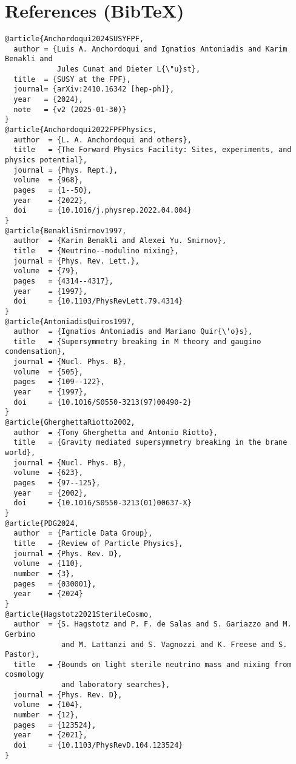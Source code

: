 \documentclass[11pt]{article}
\begin{document}
  \section*{References (Bib\TeX)}
      \begin{verbatim}
@article{Anchordoqui2024SUSYFPF,
  author = {Luis A. Anchordoqui and Ignatios Antoniadis and Karim Benakli and
            Jules Cunat and Dieter L{\"u}st},
  title  = {SUSY at the FPF},
  journal= {arXiv:2410.16342 [hep-ph]},
  year   = {2024},
  note   = {v2 (2025-01-30)}
}
@article{Anchordoqui2022FPFPhysics,
  author  = {L. A. Anchordoqui and others},
  title   = {The Forward Physics Facility: Sites, experiments, and physics potential},
  journal = {Phys. Rept.},
  volume  = {968},
  pages   = {1--50},
  year    = {2022},
  doi     = {10.1016/j.physrep.2022.04.004}
}
@article{BenakliSmirnov1997,
  author  = {Karim Benakli and Alexei Yu. Smirnov},
  title   = {Neutrino--modulino mixing},
  journal = {Phys. Rev. Lett.},
  volume  = {79},
  pages   = {4314--4317},
  year    = {1997},
  doi     = {10.1103/PhysRevLett.79.4314}
}
@article{AntoniadisQuiros1997,
  author  = {Ignatios Antoniadis and Mariano Quir{\'o}s},
  title   = {Supersymmetry breaking in M theory and gaugino condensation},
  journal = {Nucl. Phys. B},
  volume  = {505},
  pages   = {109--122},
  year    = {1997},
  doi     = {10.1016/S0550-3213(97)00490-2}
}
@article{GherghettaRiotto2002,
  author  = {Tony Gherghetta and Antonio Riotto},
  title   = {Gravity mediated supersymmetry breaking in the brane world},
  journal = {Nucl. Phys. B},
  volume  = {623},
  pages   = {97--125},
  year    = {2002},
  doi     = {10.1016/S0550-3213(01)00637-X}
}
@article{PDG2024,
  author  = {Particle Data Group},
  title   = {Review of Particle Physics},
  journal = {Phys. Rev. D},
  volume  = {110},
  number  = {3},
  pages   = {030001},
  year    = {2024}
}
@article{Hagstotz2021SterileCosmo,
  author  = {S. Hagstotz and P. F. de Salas and S. Gariazzo and M. Gerbino
             and M. Lattanzi and S. Vagnozzi and K. Freese and S. Pastor},
  title   = {Bounds on light sterile neutrino mass and mixing from cosmology
             and laboratory searches},
  journal = {Phys. Rev. D},
  volume  = {104},
  number  = {12},
  pages   = {123524},
  year    = {2021},
  doi     = {10.1103/PhysRevD.104.123524}
}
      \end{verbatim}




  \ifdefined\standalonechapter\else
  
\end{document}
